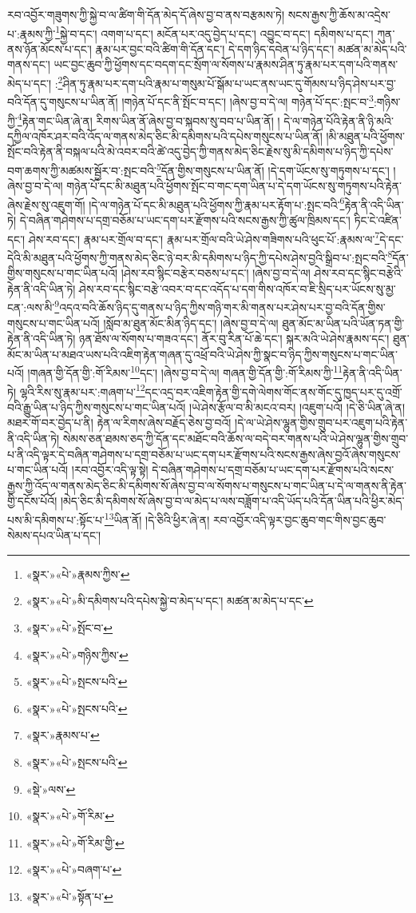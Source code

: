 རབ་འབྱོར་གཟུགས་ཀྱི་སྐྱེ་བ་ལ་ཚིག་གི་དོན་མེད་དོ་ཞེས་བྱ་བ་ནས་བརྩམས་ཏེ། སངས་རྒྱས་ཀྱི་ཆོས་མ་འདྲེས་པ་:རྣམས་ཀྱི་\footnote{«སྣར་»«པེ་»རྣམས་ཀྱིས་}སྐྱེ་བ་དང་། འགག་པ་དང་། མངོན་པར་འདུ་བྱེད་པ་དང་། འབྱུང་བ་དང་། དམིགས་པ་དང་། ཀུན་ནས་ཉོན་མོངས་པ་དང་། རྣམ་པར་བྱང་བའི་ཚིག་གི་དོན་དང་། དེ་དག་ཉིད་དབེན་པ་ཉིད་དང་། མཚན་མ་མེད་པའི་གནས་དང་། ཡང་བྱང་ཆུབ་ཀྱི་ཕྱོགས་དང་བདག་དང་སྲོག་ལ་སོགས་པ་རྣམས་ཤིན་ཏུ་རྣམ་པར་དག་པའི་གནས་མེད་པ་དང་། :\footnote{«སྣར་»«པེ་»མི་དམིགས་པའི་དཔེས་སྐྱེ་བ་མེད་པ་དང་། མཚན་མ་མེད་པ་དང་}ཤིན་ཏུ་རྣམ་པར་དག་པའི་རྣམ་པ་གསུམ་པོ་སྒོམ་པ་ཡང་ནས་ཡང་དུ་གོམས་པ་ཉིད་ཤེས་པར་བྱ་བའི་དོན་དུ་གསུངས་པ་ཡིན་ནོ། །གཉེན་པོ་དང་ནི་སྤོང་བ་དང་། །ཞེས་བྱ་བ་དེ་ལ། གཉེན་པོ་དང་:སྤང་བ་\footnote{«སྣར་»«པེ་»སྤོང་བ་}:གཉིས་ཀྱི་\footnote{«སྣར་»«པེ་»གཉིས་ཀྱིས་}རྟེན་གང་ཡིན་ཞེ་ན། རིགས་ཡིན་ནོ་ཞེས་བྱ་བ་སྐབས་སུ་བབ་པ་ཡིན་ནོ། །
དེ་ལ་གཉེན་པོའི་རྟེན་ནི་ཉི་མའི་དཀྱིལ་འཁོར་ཤར་བའི་འོད་ལ་གནས་མེད་ཅིང་མི་དམིགས་པའི་དཔེས་གསུངས་པ་ཡིན་ནོ། །མི་མཐུན་པའི་ཕྱོགས་སྤོང་བའི་རྟེན་ནི་བསྐལ་པའི་མེ་འབར་བའི་ཚེ་འདུ་བྱེད་ཀྱི་གནས་མེད་ཅིང་རྗེས་སུ་མི་དམིགས་པ་ཉིད་ཀྱི་དཔེས་བག་ཆགས་ཀྱི་མཚམས་སྦྱོར་བ་:སྤང་བའི་\footnote{«སྣར་»«པེ་»སྤངས་པའི་}དོན་གྱིས་གསུངས་པ་ཡིན་ནོ། །དེ་དག་ཡོངས་སུ་གཏུགས་པ་དང་། །ཞེས་བྱ་བ་དེ་ལ། གཉེན་པོ་དང་མི་མཐུན་པའི་ཕྱོགས་སྤོང་བ་གང་དག་ཡིན་པ་དེ་དག་ཡོངས་སུ་གཏུགས་པའི་རྟེན་ཞེས་རྗེས་སུ་འཇུག་གོ། །དེ་ལ་གཉེན་པོ་དང་མི་མཐུན་པའི་ཕྱོགས་ཀྱི་རྣམ་པར་རྟོག་པ་:སྤང་བའི་\footnote{«སྣར་»«པེ་»སྤངས་པའི་}རྟེན་ནི་འདི་ཡིན་ཏེ། དེ་བཞིན་གཤེགས་པ་དགྲ་བཅོམ་པ་ཡང་དག་པར་རྫོགས་པའི་སངས་རྒྱས་ཀྱི་ཚུལ་ཁྲིམས་དང་། ཏིང་ངེ་འཛིན་དང་། ཤེས་རབ་དང་། རྣམ་པར་གྲོལ་བ་དང་། རྣམ་པར་གྲོལ་བའི་ཡེ་ཤེས་གཟིགས་པའི་ཕུང་པོ་:རྣམས་ལ་\footnote{«སྣར་»རྣམས་པ་}དེ་དང་དེའི་མི་མཐུན་པའི་ཕྱོགས་ཀྱི་གནས་མེད་ཅིང་ཉེ་བར་མི་དམིགས་པ་ཉིད་ཀྱི་དཔེས་ཤེས་བྱའི་སྒྲིབ་པ་:སྤང་བའི་\footnote{«སྣར་»«པེ་»སྤངས་པའི་}དོན་གྱིས་གསུངས་པ་གང་ཡིན་པའོ། །ཤེས་རབ་སྙིང་བརྩེར་བཅས་པ་དང་། །ཞེས་བྱ་བ་དེ་ལ། ཤེས་རབ་དང་སྙིང་བརྩེའི་རྟེན་ནི་འདི་ཡིན་ཏེ། ཤེས་རབ་དང་སྙིང་བརྩེ་འབར་བ་དང་འདོད་པ་དག་གིས་འཁོར་བ་ཇི་སྲིད་པར་ཡོངས་སུ་མྱ་ངན་:ལས་མི་\footnote{«སྡེ་»ལས་}འདའ་བའི་ཆོས་ཉིད་དུ་གནས་པ་ཉིད་ཀྱིས་གཉི་གར་མི་གནས་པར་ཤེས་པར་བྱ་བའི་དོན་གྱིས་གསུངས་པ་གང་ཡིན་པའོ། །སློབ་མ་ཐུན་མོང་མིན་ཉིད་དང་། །ཞེས་བྱ་བ་དེ་ལ། ཐུན་མོང་མ་ཡིན་པའི་ཡོན་ཏན་གྱི་རྟེན་ནི་འདི་ཡིན་ཏེ། ཉན་ཐོས་ལ་སོགས་པ་གཟའ་དང་། ནོར་བུ་རིན་པོ་ཆེ་དང་། སྐར་མའི་ཡེ་ཤེས་རྣམས་དང་། ཐུན་མོང་མ་ཡིན་པ་མཐའ་ཡས་པའི་འཇིག་རྟེན་གཞན་དུ་འཕྲོ་བའི་ཡེ་ཤེས་ཀྱི་སྣང་བ་ཉིད་ཀྱིས་གསུངས་པ་གང་ཡིན་པའོ། །གཞན་གྱི་དོན་གྱི་:གོ་རིམས་\footnote{«སྣར་»«པེ་»གོ་རིམ་}དང་། །ཞེས་བྱ་བ་དེ་ལ། གཞན་གྱི་དོན་གྱི་:གོ་རིམས་ཀྱི་\footnote{«སྣར་»«པེ་»གོ་རིམ་གྱི་}རྟེན་ནི་འདི་ཡིན་ཏེ། ལྷའི་རིས་སུ་རྣམ་པར་:གཞག་པ་\footnote{«སྣར་»«པེ་»བཞག་པ་}དང་འདྲ་བར་འཇིག་རྟེན་གྱི་དགེ་ལེགས་གོང་ནས་གོང་དུ་ཁྱད་པར་དུ་འགྲོ་བའི་རྒྱུ་ཡིན་པ་ཉིད་ཀྱིས་གསུངས་པ་གང་ཡིན་པའོ། །ཡེ་ཤེས་རྩོལ་བ་མི་མངའ་བར། །འཇུག་པའོ། །དེ་ཅི་ཡིན་ཞེ་ན། མཐར་གོ་བར་བྱེད་པ་ནི། རྟེན་ལ་རིགས་ཞེས་བརྗོད་ཅེས་བྱ་བའོ། །དེ་ལ་ཡེ་ཤེས་ལྷུན་གྱིས་གྲུབ་པར་འཇུག་པའི་རྟེན་ནི་འདི་ཡིན་ཏེ། སེམས་ཅན་ཐམས་ཅད་ཀྱི་དོན་དང་མཐོང་བའི་ཆོས་ལ་བདེ་བར་གནས་པའི་ཡེ་ཤེས་ལྷུན་གྱིས་གྲུབ་པ་ནི་འདི་ལྟར་དེ་བཞིན་གཤེགས་པ་དགྲ་བཅོམ་པ་ཡང་དག་པར་རྫོགས་པའི་སངས་རྒྱས་ཞེས་བྱའོ་ཞེས་གསུངས་པ་གང་ཡིན་པའོ། །རབ་འབྱོར་འདི་ལྟ་སྟེ། དེ་བཞིན་གཤེགས་པ་དགྲ་བཅོམ་པ་ཡང་དག་པར་རྫོགས་པའི་སངས་རྒྱས་ཀྱི་འོད་ལ་གནས་མེད་ཅིང་མི་དམིགས་སོ་ཞེས་བྱ་བ་ལ་སོགས་པ་གསུངས་པ་གང་ཡིན་པ་དེ་ལ་གནས་ནི་རྟེན་གྱི་དངོས་པོའོ། །མེད་ཅིང་མི་དམིགས་སོ་ཞེས་བྱ་བ་ལ་མེད་པ་ལས་བཟློག་པ་འདི་ཡོད་པའི་དོན་ཡིན་པའི་ཕྱིར་མེད་པས་མི་དམིགས་པ་:སྟོང་པ་\footnote{«སྣར་»«པེ་»སྟོན་པ་}ཡིན་ནོ། །དེ་ཅིའི་ཕྱིར་ཞེ་ན། རབ་འབྱོར་འདི་ལྟར་བྱང་ཆུབ་གང་གིས་བྱང་ཆུབ་སེམས་དཔའ་ཡིན་པ་དང་། 